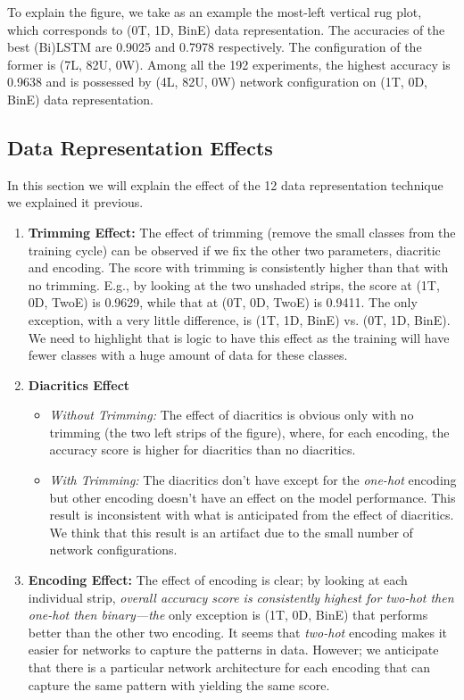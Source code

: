 To explain the figure, we take as an example the most-left vertical rug plot, which corresponds to (0T, 1D, BinE) data representation. The accuracies of the best (Bi)LSTM are 0.9025 and 0.7978 respectively. The configuration of the former is (7L, 82U, 0W). Among all the 192 experiments, the highest accuracy is 0.9638 and is possessed by (4L, 82U, 0W) network configuration on (1T, 0D, BinE) data representation.

\subsection{Data Representation Effects}

In this section we will explain the effect of the 12 data representation technique we explained it previous.

\begin{enumerate}
 \item \textbf{Trimming Effect:} The effect of trimming (remove the small classes from the training cycle) can be observed if we fix the other two parameters, diacritic and encoding. The score with trimming is consistently higher than that with no trimming. E.g., by looking at the two unshaded strips, the score at (1T, 0D, TwoE) is 0.9629, while that at (0T, 0D, TwoE) is 0.9411. The only exception, with a very little difference, is (1T, 1D, BinE) vs. (0T, 1D, BinE). We need to highlight that is logic to have this effect as the training will have fewer classes with a huge amount of data for these classes.
 \item \textbf{Diacritics Effect}
 \begin{itemize}
  \item \textit{Without Trimming:} The effect of diacritics is obvious only with no trimming (the two left strips of the figure), where, for each encoding, the accuracy score is higher for diacritics than no diacritics.
  \item \textit{With Trimming:} The diacritics don't have except for the \textit{\textit{one-hot}} encoding but other encoding doesn't have an effect on the model performance. This result is inconsistent with what is anticipated from the effect of diacritics. We think that this result is an artifact due to the small number of network configurations.

 \end{itemize} 
 \item \textbf{Encoding Effect:} The effect of encoding is clear; by looking at each individual strip, \textit{overall accuracy score is consistently highest for \textit{two-hot} then \textit{one-hot} then \textit{binary}—the} only exception is (1T, 0D, BinE) that performs better than the other two encoding. It seems that \textit{two-hot} encoding makes it easier for networks to capture the patterns in data. However; we anticipate that there is a particular network architecture for each encoding that can capture the same pattern with yielding the same score.
\end{enumerate}



